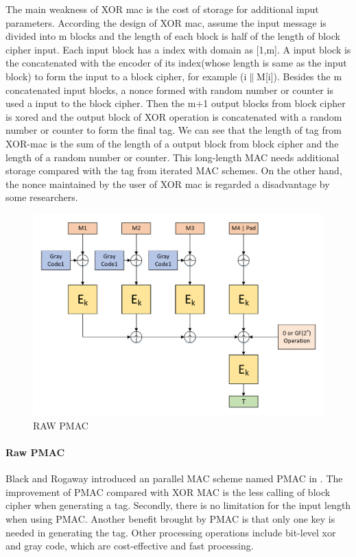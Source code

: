 \documentclass{article}
\begin{document}
The main weakness of XOR mac is the cost of storage for additional input parameters. According the design of XOR mac, assume the input message is divided into m blocks and the length of each block is half of the length of block cipher input. Each input block has a index with domain as [1,m]. A input block is the concatenated with the encoder of its index(whose length is same as the input block) to form the input to a block cipher, for example (i$\|$M[i]). Besides the m concatenated input blocks, a nonce formed with random number or counter is used a input to the block cipher. Then the m+1 output blocks from block cipher is xored and the output block of XOR operation is concatenated with a random number or counter to form the final tag. 
We can see that the length of tag from XOR-mac is the sum of the length of a output block from block cipher and the length of a random number or counter. This long-length MAC needs additional storage compared with the tag from iterated MAC schemes. 
On the other hand, the nonce maintained by the user of XOR mac is regarded a disadvantage by some researchers.
\begin{figure}[htbp]
\centering
\includegraphics[scale=0.5]{./diagrams/pmac.pdf}
\caption{RAW PMAC}
\label{PMAC}
\end{figure}
\paragraph{Raw PMAC}
Black and Rogaway introduced an parallel MAC scheme named PMAC in \cite{pmac}. 
The improvement of PMAC compared with XOR MAC is the less calling of block cipher when generating a tag. Secondly, there is no limitation for the input length when using PMAC. 
Another benefit brought by PMAC is that only one key is needed in generating the tag. Other processing operations include bit-level xor and gray code, which are cost-effective and fast processing. 
\end{document}
